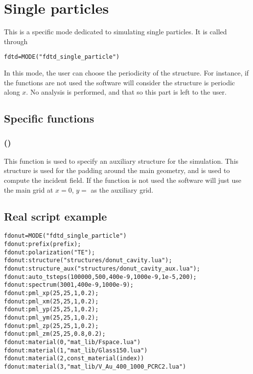 \section{Single particles}

This is a specific mode dedicated to simulating single particles. It is called through
\begin{lstlisting}
fdtd=MODE("fdtd_single_particle")
\end{lstlisting}
In this mode, the user can choose the periodicity of the structure. For instance, if the  functions are not used the software will consider the structure is periodic along $x$. No analysis is performed, and that so this part is left to the user.


\subsection{Specific functions}


\subsubsection[structure\_aux]{()}

This function is used to specify an auxiliary structure for the simulation. This structure is used for the padding around the main geometry, and is used to compute the incident field. If the function is not used the software will just use the main grid at $x=0$, $y=$ as the auxiliary grid.

\subsection{Real script example}

\begin{lstlisting}
fdonut=MODE("fdtd_single_particle")
fdonut:prefix(prefix);
fdonut:polarization("TE");
fdonut:structure("structures/donut_cavity.lua");
fdonut:structure_aux("structures/donut_cavity_aux.lua");
fdonut:auto_tsteps(100000,500,400e-9,1000e-9,1e-5,200);
fdonut:spectrum(3001,400e-9,1000e-9);
fdonut:pml_xp(25,25,1,0.2);
fdonut:pml_xm(25,25,1,0.2);
fdonut:pml_yp(25,25,1,0.2);
fdonut:pml_ym(25,25,1,0.2);
fdonut:pml_zp(25,25,1,0.2);
fdonut:pml_zm(25,25,0.8,0.2);
fdonut:material(0,"mat_lib/Fspace.lua")
fdonut:material(1,"mat_lib/Glass150.lua")
fdonut:material(2,const_material(index))
fdonut:material(3,"mat_lib/V_Au_400_1000_PCRC2.lua")
\end{lstlisting}





	